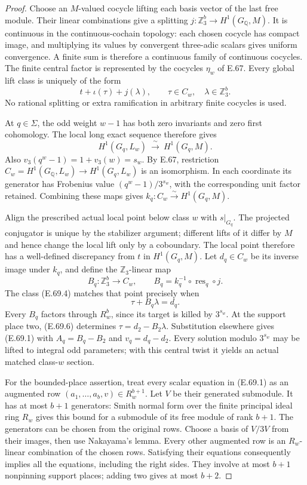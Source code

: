 \begin{proof}
Choose an $M$-valued cocycle lifting each
basis vector of the last free module.
Their linear combinations give a splitting
$j:\mathbb Z_3^b\to H^1(G_{\mathbb Q},M)$.
It is continuous in the continuous-cochain
topology: each chosen cocycle has compact
image, and multiplying its values by
convergent three-adic scalars gives uniform
convergence. A finite sum is therefore a
continuous family of continuous cocycles.
The finite central factor is represented
by the cocycles $\eta_w$ of E.67.
Every global lift class is uniquely of
the form
\[
            t+\iota(\tau)+j(\lambda),
       \qquad \tau\in C_w,\quad
              \lambda\in\mathbb Z_3^b .
 \tag{E.69.4}
\]
No rational splitting or extra ramification
in arbitrary finite cocycles is used.

At $q\in\Sigma$, the odd weight $w-1$
has both zero invariants and zero first
cohomology. The local long exact sequence
therefore gives
\[
 H^1(G_q,L_w)\ \xrightarrow{\ \sim\ }\
                         H^1(G_q,M).
 \tag{E.69.5}
\]
Also $v_3(q^w-1)=1+v_3(w)=s_w$.
By E.67, restriction
$C_w=H^1(G_{\mathbb Q},L_w)\to
H^1(G_q,L_w)$ is an isomorphism.
In each coordinate its generator has
Frobenius value $(q^w-1)/3^{s_w}$,
with the corresponding unit factor
retained. Combining these maps gives
$k_q:C_w\xrightarrow{\sim}H^1(G_q,M)$.

Align the prescribed actual local point
below class $w$ with $s|_{G_q}$.
The projected conjugator is unique by
the stabilizer argument; different lifts
of it differ by $M$ and hence change
the local lift only by a coboundary.
The local point therefore has a
well-defined discrepancy from $t$ in
$H^1(G_q,M)$. Let $d_q\in C_w$ be
its inverse image under $k_q$, and
define the $\mathbb Z_3$-linear map
\[
 B_q:\mathbb Z_3^b\longrightarrow C_w,
 \qquad B_q=k_q^{-1}\circ
                    \operatorname{res}_q\circ j .
\]
The class (E.69.4) matches that point
precisely when
\[
                         \tau+B_q\lambda=d_q .
 \tag{E.69.6}
\]
Every $B_q$ factors through $R_w^b$,
since its target is killed by $3^{s_w}$.
At the support place two, (E.69.6)
determines $\tau=d_2-B_2\lambda$.
Substitution elsewhere gives (E.69.1)
with $A_q=B_q-B_2$ and $v_q=d_q-d_2$.
Every solution modulo $3^{s_w}$ may
be lifted to integral odd parameters;
with this central twist it yields an
actual matched class-$w$ section.

For the bounded-place assertion,
treat every scalar equation in
(E.69.1) as an augmented row
$(a_1,\ldots,a_b,v)\in R_w^{b+1}$.
Let $V$ be their generated submodule.
It has at most $b+1$ generators:
Smith normal form over the finite
principal ideal ring $R_w$ gives
this bound for a submodule of its
free module of rank $b+1$.
The generators can be chosen from
the original rows. Choose a basis
of $V/3V$ from their images, then
use Nakayama's lemma.
Every other augmented row is an
$R_w$-linear combination of the
chosen rows. Satisfying their
equations consequently implies
all the equations, including the
right sides. They involve at most
$b+1$ nonpinning support places;
adding two gives at most $b+2$.


\end{proof}
